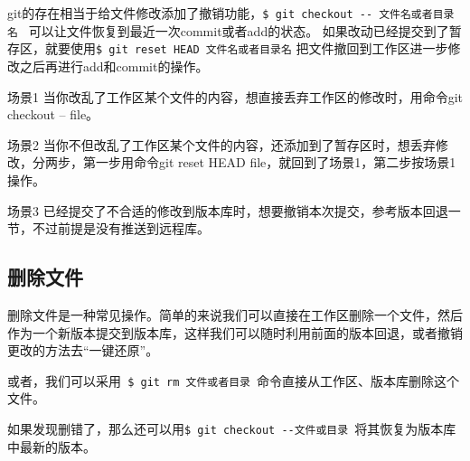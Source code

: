 \documentclass[UTF8]{ctexart}
\begin{document}
git的存在相当于给文件修改添加了撤销功能，\verb!$ git checkout -- 文件名或者目录名 ! 可以让文件恢复到最近一次commit或者add的状态。
如果改动已经提交到了暂存区，就要使用\verb!$ git reset HEAD 文件名或者目录名! 把文件撤回到工作区进一步修改之后再进行add和commit的操作。

\begin{list}{场景}{\textbf{撤销更改的几种情况}}
\item[场景1]当你改乱了工作区某个文件的内容，想直接丢弃工作区的修改时，用命令git checkout -- file。
\item[场景2]当你不但改乱了工作区某个文件的内容，还添加到了暂存区时，想丢弃修改，分两步，第一步用命令git reset HEAD file，就回到了场景1，第二步按场景1操作。
\item[场景3]已经提交了不合适的修改到版本库时，想要撤销本次提交，参考版本回退一节，不过前提是没有推送到远程库。
\end{list}

\subsection{删除文件}
删除文件是一种常见操作。简单的来说我们可以直接在工作区删除一个文件，然后作为一个新版本提交到版本库，这样我们可以随时利用前面的版本回退，或者撤销更改的方法去“一键还原”。

或者，我们可以采用\verb! $ git rm 文件或者目录 !命令直接从工作区、版本库删除这个文件。

如果发现删错了，那么还可以用\verb!$ git checkout --文件或目录 !将其恢复为版本库中最新的版本。
\end{document}
